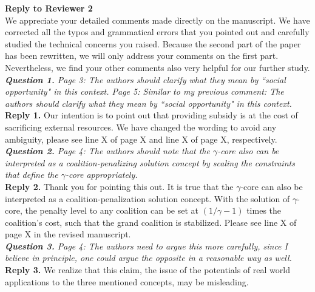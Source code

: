 \documentclass[11pt]{article}
\begin{document}
\noindent \textbf{\large Reply to Reviewer 2}
\\[3mm] 
We appreciate your detailed comments made directly on the manuscript. 
We have corrected all the typos and grammatical errors that you pointed out and carefully studied the technical concerns you raised.
Because the second part of the paper has been rewritten, we will only address your comments on the first part.
Nevertheless, we find your other comments also very helpful for our further study.
\\[4mm] 
%
%
%
%
\noindent \textit{\textbf{Question 1.}
Page 3: The authors should clarify what they mean by ``social opportunity" in this context. Page 5: Similar to my previous comment: The authors should clarify what they mean by ``social opportunity" in this context.
}
\\[2mm]
\noindent \textbf{Reply 1.}
Our intention is to point out that providing subsidy is at the cost of sacrificing  external resources.
We have changed the wording to avoid any ambiguity, please see line X of page X and line X of page X, respectively.
\\[4mm]
%
%
%
\noindent \textit{\textbf{Question 2.}
Page 4: The authors should note that the $\gamma$-core also can be interpreted as a coalition-penalizing solution concept by scaling the constraints that define the
$\gamma$-core appropriately.
}
\\[2mm]
\noindent \textbf{Reply 2.}
Thank you for pointing this out.
It is true that the $\gamma$-core can also be interpreted as a coalition-penalization solution concept.
With the solution of $\gamma$-core, the penalty level to any coalition can be set at $(1/\gamma-1)$ times the coalition's cost, such that the grand coalition is stabilized.
Please see line X of page X in the revised manuscript.
\\[4mm]
%
%
%
\noindent \textit{\textbf{Question 3.}
Page 4: The authors need to argue this more carefully, since I believe in principle, one could argue the opposite in a reasonable way as well.
}
\\[2mm]
\noindent \textbf{Reply 3.}
We realize that this claim, the issue of the potentials of real world applications to the three mentioned concepts, may be misleading.
\end{document}
